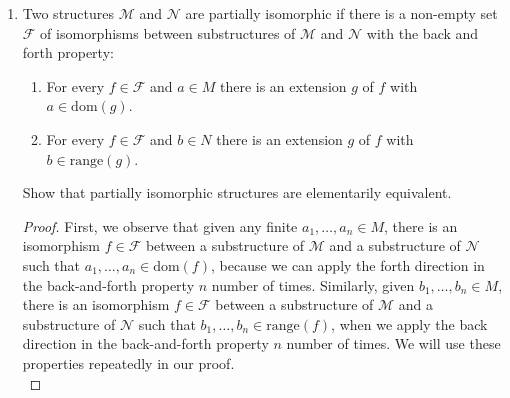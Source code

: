 \documentclass{article}
\begin{document}
\begin{enumerate}[label={\bf Q\arabic*:}]
\begin{proof}
      It is routine to show that $\sim$ is an equivalence relation.
      Consider the size of $\mathbb{Z}^k/\sim$. We have
      $|\mathbb{Z}^k/\sim|=2^k$. Hence in $\mathbb{Z}^k$, we can find
      exactly $2^k$ elements from distinct classes, and no more than $2^k$
      such elements. Then given $n>m\in\mathbb{N}^+$, the sentence
      $\varphi_n$ which says ``I have $2^k$ elements from distinct
      classes'' will be satisfied by $\mathbb{Z}^n$ but not by
      $\mathbb{Z}^m$. We can formalize $\varphi_n$ in first order language
      as
      \begin{equation*}
        \varphi_n := \exists x_1,\ldots,x_{2^n}\; \bigwedge_{1\leq
        i<j\leq2^n} \varphi_{\text{diff class}}(x_i,x_j),
      \end{equation*}
      where $\varphi_{\text{diff class}}(x,y)$ says ``$x$ and $y$ are from
      different equivalence classes, formalized in first order language as
      \begin{equation*}
        \varphi_{\text{diff class}}(x,y) := \exists z\; y=x+z+z.
      \end{equation*}
      Then $\varphi_n$ is a sentence that witnesses
      $\langle\mathbb{Z}^n,+,0\rangle\not\equiv\langle\mathbb{Z}^m,+,0\rangle$.
    \end{proof}

  \item Two structures $\mathcal{M}$ and $\mathcal{N}$ are partially
    isomorphic if there is a non-empty set $\mathcal{F}$ of isomorphisms
    between substructures of $\mathcal{M}$ and $\mathcal{N}$ with the back
    and forth property:
    \begin{enumerate}
      \item For every $f\in\mathcal{F}$ and $a\in M$ there is an extension
        $g$ of $f$ with $a\in\text{dom}(g)$.
      \item For every $f\in\mathcal{F}$ and $b\in N$ there is an extension
        $g$ of $f$ with $b\in\text{range}(g)$.
    \end{enumerate}
    Show that partially isomorphic structures are elementarily equivalent.

    \begin{proof}
      First, we observe that given any finite $a_1,\ldots,a_n\in M$, there
      is an isomorphism $f\in\mathcal{F}$ between a substructure of
      $\mathcal{M}$ and a substructure of $\mathcal{N}$ such that
      $a_1,\ldots,a_n\in\text{dom}(f)$, because we can apply the forth
      direction in the back-and-forth property $n$ number of times.
      Similarly, given $b_1,\ldots,b_n\in M$, there is an isomorphism
      $f\in\mathcal{F}$ between a substructure of $\mathcal{M}$ and a
      substructure of $\mathcal{N}$ such that
      $b_1,\ldots,b_n\in\text{range}(f)$, when we apply the back direction in
      the back-and-forth property $n$ number of times. We will use these
      properties repeatedly in our proof. \\


\end{proof}
\end{enumerate}
\end{document}
